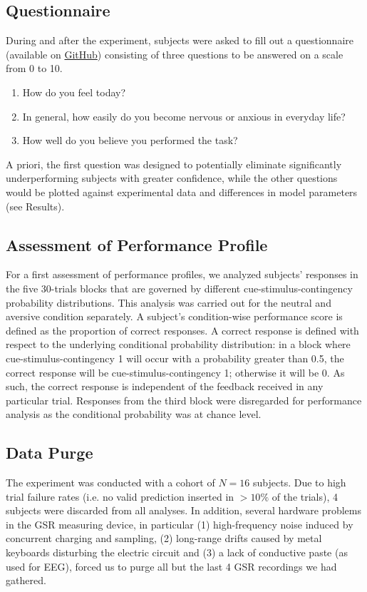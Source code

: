 \documentclass{article}
\begin{document}
\begin{multicols}{2}
\subsection*{Questionnaire}
During and after the experiment, subjects were asked to fill out a questionnaire (available on \href{https://github.com/tnm-finalproject/TNM_project/blob/master/instruction_sheet.pdf}{GitHub}) consisting of three questions to be answered on a scale from 0 to 10. 
\begin{enumerate}
\item How do you feel today?
\item In general, how easily do you become nervous or anxious in everyday life?
\item How well do you believe you performed the task?
\end{enumerate}
A priori, the first question was designed to potentially eliminate significantly underperforming subjects with greater confidence, while the other questions would be plotted against experimental data and differences in model parameters (see \textsf{Results}).  \\

\subsection*{Assessment of Performance Profile}
\label{sec:ass}
For a first assessment of performance profiles, we analyzed subjects' responses in the five 30-trials blocks that are governed by different cue-stimulus-contingency probability distributions. This analysis was carried out for the neutral and aversive condition separately. A subject's condition-wise performance score is defined as the proportion of correct responses. A correct response is defined with respect to the underlying conditional probability distribution: in a block where cue-stimulus-contingency 1 will occur with a probability greater than 0.5, the correct response will be cue-stimulus-contingency 1; otherwise it will be 0. As such, the correct response is independent of the feedback received in any particular trial. Responses from the third block were disregarded for performance analysis as the conditional probability was at chance level. \\


\subsection*{Data Purge}
\label{sec:purge}
The experiment was conducted with a cohort of $N=16$ subjects. Due to high trial failure rates (i.e. no valid prediction inserted in $>10\%$ of the trials), 4 subjects were discarded from all analyses. In addition, several hardware problems in the GSR measuring device, in particular (1) high-frequency noise induced by concurrent charging and sampling, (2) long-range drifts caused by metal keyboards disturbing the electric circuit and (3) a lack of conductive paste (as used for EEG), forced us to purge all but the last 4 GSR recordings we had gathered. \\


\end{multicols}
\end{document}

